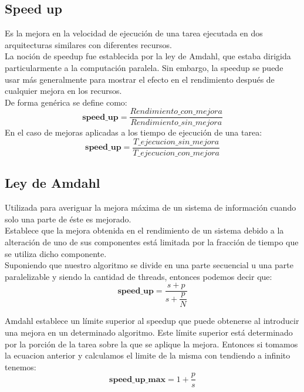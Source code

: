 \subsection{Speed up}

Es la mejora en la velocidad de ejecución de una tarea ejecutada en dos
arquitecturas similares con diferentes recursos.\\
La noción de speedup fue establecida por la ley de Amdahl, que estaba
dirigida particularmente a la computación paralela. Sin embargo, la speedup se
puede usar más generalmente para mostrar el efecto en el rendimiento después de
cualquier mejora en los recursos.\\
De forma genérica se define como:
\begin{equation}
    \textbf{speed\_up} = \dfrac{Rendimiento\_con\_mejora}{Rendimiento\_sin\_mejora}
\end{equation}
En el caso de mejoras aplicadas a los tiempo de ejecución de una tarea:
\begin{equation}
    \textbf{speed\_up} = \dfrac{T\_ejecucion\_sin\_mejora}{T\_ejecucion\_con\_mejora}
\end{equation}

\subsection{Ley de Amdahl}

Utilizada para averiguar la mejora máxima de un sistema de información cuando
solo una parte de éste es mejorado.\\
Establece que la mejora obtenida en el rendimiento de un sistema debido a la
alteración de uno de sus componentes está limitada por la fracción de tiempo
que se utiliza dicho componente.\\

Suponiendo que nuestro algoritmo se divide en una parte secuencial 
u una parte paralelizable  y siendo  la cantidad de threads,
entonces podemos decir que:
\begin{equation}
    \textbf{speed\_up} = \dfrac{s+p}{s+\dfrac{p}{N}}
\end{equation}

Amdahl establece un límite superior al speedup que puede obtenerse al
introducir una mejora en un determinado algoritmo. Este límite superior está
determinado por la porción de la tarea sobre la que se aplique la mejora.
Entonces si tomamos la ecuacion anterior y calculamos el limite de la misma con
 tendiendo a infinito tenemos:
\begin{equation}
    \textbf{speed\_up\_max} = 1 + \dfrac{p}{s}
\end{equation}
\newpage

